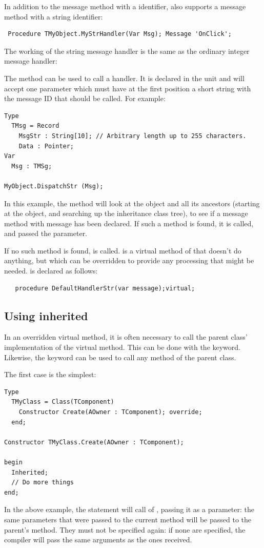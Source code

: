 In addition to the message method with a  identifier,
\fpc also supports a message method with a string identifier:
\begin{verbatim}
 Procedure TMyObject.MyStrHandler(Var Msg); Message 'OnClick';
\end{verbatim}
The working of the string message handler is the same as the ordinary
integer message handler:

The   method can be used to call a 
handler. It is declared in the  unit and will accept one parameter
which must have at the first position a short string with the message ID that
should be called. For example:
\begin{verbatim}
Type
  TMsg = Record
    MsgStr : String[10]; // Arbitrary length up to 255 characters.
    Data : Pointer;
Var
  Msg : TMSg;

MyObject.DispatchStr (Msg);
\end{verbatim}
In this example, the  method will look at the object and
all its ancestors (starting at the object, and searching up the inheritance
class tree), to see if a message method with message  has been
declared. If such a method is found, it is called, and passed the
 parameter.

If no such method is found,  is called.
 is a virtual method of  that doesn't do
anything, but which can be overridden to provide any processing that might be
needed.  is declared as follows:
\begin{verbatim}
   procedure DefaultHandlerStr(var message);virtual;
\end{verbatim}

\subsection{Using inherited}
In an overridden virtual method, it is often necessary to call the parent
class' implementation of the virtual method. This can be  done with the
 keyword. Likewise, the  keyword can be used
to call any method of the parent class.

The first case is the simplest:
\begin{verbatim}
Type
  TMyClass = Class(TComponent)
    Constructor Create(AOwner : TComponent); override;
  end;

Constructor TMyClass.Create(AOwner : TComponent);

begin
  Inherited;
  // Do more things
end;
\end{verbatim}
In the above example, the  statement will call 
of , passing it  as a parameter: the same
parameters that were passed to the current method will be passed to the
parent's method. They must not be specified again: if none are specified,
the compiler will pass the same arguments as the ones received.

